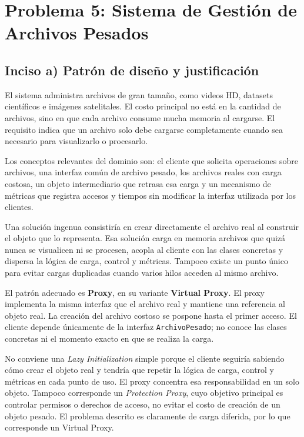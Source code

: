 \section{Problema 5: Sistema de Gestión de Archivos Pesados}

\subsection{Inciso a) Patrón de diseño y justificación}

El sistema administra archivos de gran tamaño, como videos HD, datasets científicos e imágenes satelitales. El costo principal no está en la cantidad de archivos, sino en que cada archivo consume mucha memoria al cargarse. El requisito indica que un archivo solo debe cargarse completamente cuando sea necesario para visualizarlo o procesarlo.

Los conceptos relevantes del dominio son: el cliente que solicita operaciones sobre archivos, una interfaz común de archivo pesado, los archivos reales con carga costosa, un objeto intermediario que retrasa esa carga y un mecanismo de métricas que registra accesos y tiempos sin modificar la interfaz utilizada por los clientes.

Una solución ingenua consistiría en crear directamente el archivo real al construir el objeto que lo representa. Esa solución carga en memoria archivos que quizá nunca se visualicen ni se procesen, acopla al cliente con las clases concretas y dispersa la lógica de carga, control y métricas. Tampoco existe un punto único para evitar cargas duplicadas cuando varios hilos acceden al mismo archivo.

El patrón adecuado es \textbf{Proxy}, en su variante \textbf{Virtual Proxy}. El proxy implementa la misma interfaz que el archivo real y mantiene una referencia al objeto real. La creación del archivo costoso se pospone hasta el primer acceso. El cliente depende únicamente de la interfaz \texttt{ArchivoPesado}; no conoce las clases concretas ni el momento exacto en que se realiza la carga.

No conviene una \emph{Lazy Initialization} simple porque el cliente seguiría sabiendo cómo crear el objeto real y tendría que repetir la lógica de carga, control y métricas en cada punto de uso. El proxy concentra esa responsabilidad en un solo objeto. Tampoco corresponde un \emph{Protection Proxy}, cuyo objetivo principal es controlar permisos o derechos de acceso, no evitar el costo de creación de un objeto pesado. El problema descrito es claramente de carga diferida, por lo que corresponde un Virtual Proxy.

